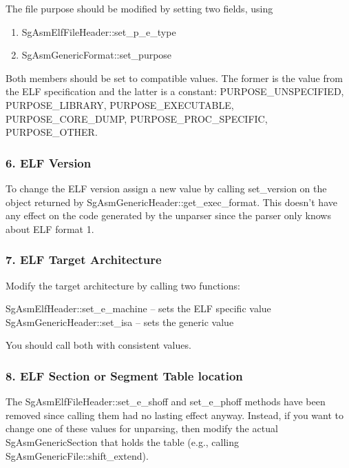    The file purpose should be modified by setting two fields, using

\begin{enumerate}
      \item SgAsmElfFileHeader::set\_p\_e\_type
      \item SgAsmGenericFormat::set\_purpose
\end{enumerate}

   Both members should be set to compatible values. The former is the value from the ELF specification and the latter is a
   constant: PURPOSE\_UNSPECIFIED, PURPOSE\_LIBRARY, PURPOSE\_EXECUTABLE, PURPOSE\_CORE\_DUMP, PURPOSE\_PROC\_SPECIFIC, PURPOSE\_OTHER.


\subsubsection{6. ELF Version}

   To change the ELF version assign a new value by calling set\_version on the object returned by
   SgAsmGenericHeader::get\_exec\_format.  This doesn't have any effect on the code generated by the unparser since the parser
   only knows about ELF format 1.
   
\subsubsection{7. ELF Target Architecture}

   Modify the target architecture by calling two functions:

       SgAsmElfHeader::set\_e\_machine -- sets the ELF specific value
       SgAsmGenericHeader::set\_isa   -- sets the generic value

   You should call both with consistent values.

\subsubsection{8. ELF Section or Segment Table location}

   The SgAsmElfFileHeader::set\_e\_shoff and set\_e\_phoff methods have been removed since calling them had no lasting effect
   anyway. Instead, if you want to change one of these values for unparsing, then modify the actual SgAsmGenericSection that
   holds the table (e.g., calling SgAsmGenericFile::shift\_extend).


